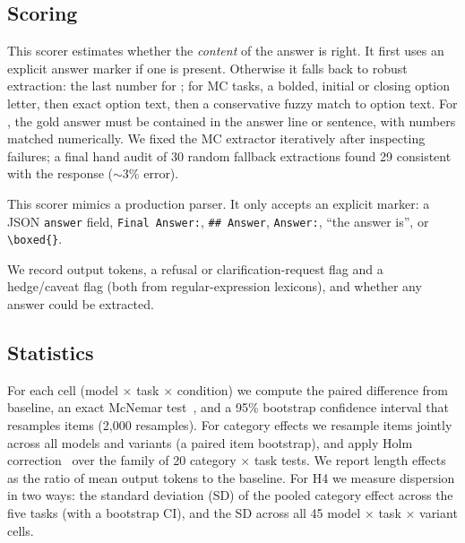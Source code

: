 \subsection{Scoring}
 This scorer estimates whether the {\em content} of the answer is right. It first uses an explicit answer marker if one is present. Otherwise it falls back to robust extraction: the last number for \gsm; for MC tasks, a bolded, initial or closing option letter, then exact option text, then a conservative fuzzy match to option text. For \drop, the gold answer must be contained in the answer line or sentence, with numbers matched numerically. We fixed the MC extractor iteratively after inspecting failures; a final hand audit of 30 random fallback extractions found 29 consistent with the response ($\sim$3\% error).

 This scorer mimics a production parser. It only accepts an explicit marker: a JSON \texttt{answer} field, \texttt{Final Answer:}, \texttt{\#\# Answer}, \texttt{Answer:}, ``the answer is'', or \texttt{\textbackslash boxed\{\}}.

 We record output tokens, a refusal or clarification-request flag and a hedge/caveat flag (both from regular-expression lexicons), and whether any answer could be extracted.

\subsection{Statistics}
For each cell (model $\times$ task $\times$ condition) we compute the paired difference from baseline, an exact McNemar test~\cite{mcnemar1947note}, and a 95\% bootstrap confidence interval that resamples items (2,000 resamples). For category effects we resample items jointly across all models and variants (a paired item bootstrap), and apply Holm correction~\cite{holm1979simple} over the family of 20 category $\times$ task tests. We report length effects as the ratio of mean output tokens to the baseline. For H4 we measure dispersion in two ways: the standard deviation (SD) of the pooled category effect across the five tasks (with a bootstrap CI), and the SD across all 45 model $\times$ task $\times$ variant cells.
